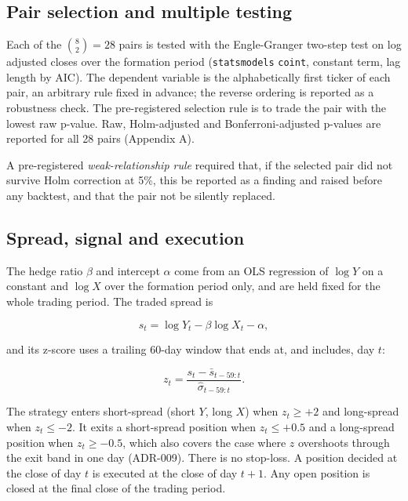 \documentclass[11pt]{article}
\begin{document}
\hypertarget{pair-selection-and-multiple-testing}{%
\subsection{Pair selection and multiple testing}\label{pair-selection-and-multiple-testing}}

Each of the \(\binom{8}{2} = 28\) pairs is tested with the Engle-Granger
two-step test on log adjusted closes over the formation period
(\texttt{statsmodels} \texttt{coint}, constant term, lag length by AIC). The dependent
variable is the alphabetically first ticker of each pair, an arbitrary
rule fixed in advance; the reverse ordering is reported as a robustness
check. The pre-registered selection rule is to trade the pair with the
lowest raw p-value. Raw, Holm-adjusted and Bonferroni-adjusted p-values are
reported for all 28 pairs (Appendix A).

A pre-registered \emph{weak-relationship rule} required that, if the selected
pair did not survive Holm correction at 5\%, this be reported as a finding
and raised before any backtest, and that the pair not be silently replaced.

\hypertarget{spread-signal-and-execution}{%
\subsection{Spread, signal and execution}\label{spread-signal-and-execution}}

The hedge ratio \(\beta\) and intercept \(\alpha\) come from an OLS regression
of \(\log Y\) on a constant and \(\log X\) over the formation period only, and
are held fixed for the whole trading period. The traded spread is

\[s_t = \log Y_t - \beta \log X_t - \alpha,\]

and its z-score uses a trailing 60-day window that ends at, and includes,
day \(t\):

\[z_t = \frac{s_t - \bar{s}_{t-59:t}}{\hat\sigma_{t-59:t}}.\]

The strategy enters short-spread (short \(Y\), long \(X\)) when \(z_t \ge +2\)
and long-spread when \(z_t \le -2\). It exits a short-spread position when
\(z_t \le +0.5\) and a long-spread position when \(z_t \ge -0.5\), which also
covers the case where \(z\) overshoots through the exit band in one day
(ADR-009). There is no stop-loss. A position decided at the close of day
\(t\) is executed at the close of day \(t+1\). Any open position is closed at
the final close of the trading period.
\end{document}
